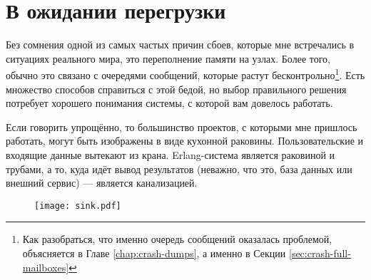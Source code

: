 
\chapter{В ожидании перегрузки}
\label{chap:overload}

Без сомнения одной из самых частых причин сбоев, которые мне встречались в ситуациях реального мира, это переполнение памяти на узлах. Более того, обычно это связано с очередями сообщений, которые растут бесконтрольно\footnote{Как разобраться, что именно очередь сообщений оказалась проблемой, объясняется в Главе \ref{chap:crash-dumps}, а именно в Секции \ref{sec:crash-full-mailboxes}}. Есть множество способов справиться с этой бедой, но выбор правильного решения потребует хорошего понимания системы, с которой вам довелось работать.

Если говорить упрощённо, то большинство проектов, с которыми мне пришлось работать, могут быть изображены в виде кухонной раковины. Пользовательские и входящие данные вытекают из крана. Erlang-система является раковиной и трубами, а то, куда идёт вывод результатов (неважно, что это, база данных или внешний сервис) --- является канализацией.

\begin{figure}[h!]
  \texttt{[image: sink.pdf]}%
  \centering%
   \label{fig:tracing-venn}
\end{figure}

